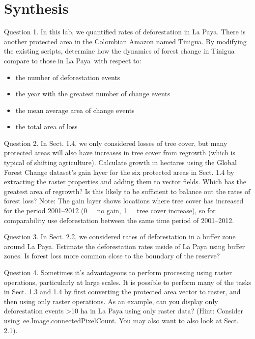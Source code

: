 \documentclass[
  letterpaper,
  DIV=11,
  numbers=noendperiod]{scrreprt}
\providecommand{\tightlist}{%
  \setlength{\itemsep}{0pt}\setlength{\parskip}{0pt}}\usepackage{longtable,booktabs,array}
\begin{document}
\hypertarget{synthesis-14}{%
\section*{Synthesis}\label{synthesis-14}}


Question 1. In this lab, we quantified rates of deforestation in La
Paya. There is another protected area in the Colombian Amazon named
Tinigua. By modifying the existing scripts, determine how the dynamics
of forest change in Tinigua compare to those in La Paya~with respect to:

\begin{itemize}
\tightlist
\item
  the number of deforestation events
\item
  the year with the greatest number of change events
\item
  the mean average area of change events
\item
  the total area of loss
\end{itemize}

Question 2. In Sect. 1.4, we only considered losses of tree cover, but
many protected areas will also have increases in tree cover from
regrowth (which is typical of shifting agriculture). Calculate growth in
hectares using the Global Forest Change dataset's gain layer for the six
protected areas in Sect. 1.4 by extracting the raster properties and
adding them to vector fields. Which has the greatest area of regrowth?
Is this likely to be sufficient to balance out the rates of forest loss?
Note: The gain layer shows locations where tree cover has increased for
the period 2001--2012 (0 = no gain, 1 = tree cover increase), so for
comparability use deforestation between the same time period of
2001--2012.

Question 3. In Sect. 2.2, we considered rates of deforestation in a
buffer zone around La Paya. Estimate the deforestation rates inside of
La Paya using buffer zones. Is forest loss more common close to the
boundary of the reserve?

Question 4. Sometimes it's advantageous to perform processing using
raster operations, particularly at large scales. It is possible to
perform many of the tasks in Sect. 1.3 and 1.4 by first converting the
protected area vector to raster, and then using only raster operations.
As an example, can you display only deforestation events \textgreater10
ha in La Paya using only raster data? (Hint: Consider
using~ee.Image.connectedPixelCount. You may also want to also look at
Sect. 2.1).
\end{document}

